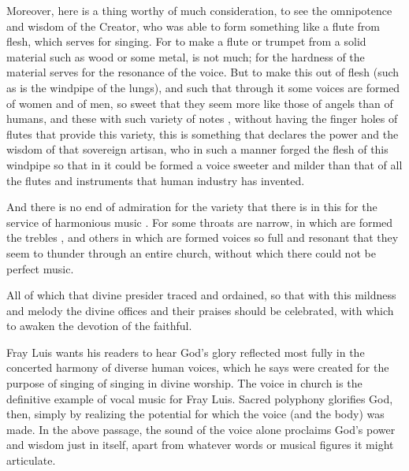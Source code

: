 \begin{quoting} 
    Moreover, here is a thing worthy of much consideration, to see the
    omnipotence and wisdom of the Creator, who was able to form something like
    a flute from flesh, which serves for singing.
    For to make a flute or trumpet from a solid material such as wood or some
    metal, is not much; for the hardness of the material serves for the
    resonance of the voice.  
    But to  make this out of flesh (such as is the windpipe of the lungs), and
    such that through it some voices are formed of women and of men, so sweet
    that they seem more like those of angels than of humans, and these with
    such variety of notes , without having the finger holes of
    flutes that provide this variety, this is something that declares the power
    and the wisdom of that sovereign artisan, who in such a manner forged the
    flesh of this windpipe so that in it could be formed a voice sweeter and
    milder than that of all the flutes and instruments that human industry has
    invented.

    And there is no end of admiration for the variety that there is in this for
    the service of harmonious music .  
    For some throats are narrow, in which are formed the trebles ,
    and others in which are formed voices so full and resonant that they seem
    to thunder through an entire church, without which there could not be
    perfect music.

    All of which that divine presider traced and ordained, so that with this
    mildness and melody the divine offices and their praises should be
    celebrated, with which to awaken the devotion of the faithful.%
        \Autocite[252]{LuisdeGranada:Simbolo} 
\end{quoting}

Fray Luis wants his readers to hear God's glory reflected most fully in the
concerted harmony of diverse human voices, which he says were created for the
purpose of singing of singing in divine worship.
The voice in church is the definitive example of vocal music for Fray Luis.
Sacred polyphony glorifies God, then, simply by realizing the potential for
which the voice (and the body) was made.
In the above passage, the sound of the voice alone proclaims God's power and
wisdom just in itself, apart from whatever words or musical figures it might
articulate.


